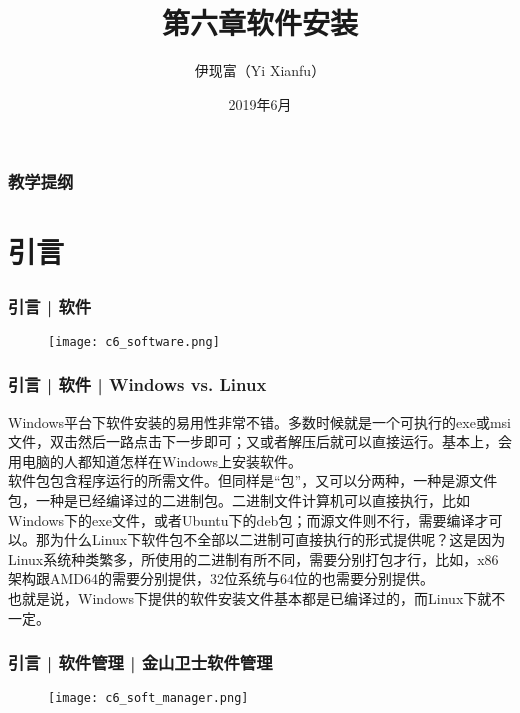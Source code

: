 



\title[软件安装]{第六章\quad 软件安装}
\author[Yixf]{伊现富（Yi Xianfu）}
\date{2019年6月}


\begin{frame}
  \titlepage
\end{frame}

\begin{frame}[plain,label=current]
  \frametitle{教学提纲}
  \setcounter{tocdepth}{3}
  \begin{multicols}{2}
    \tableofcontents
  \end{multicols}
\end{frame}


\section{引言}
\begin{frame}
  \frametitle{引言 | 软件}
  \begin{figure}
    \centering
    \texttt{[image: c6\_software.png]}
  \end{figure}
\end{frame}

\begin{frame}
  \frametitle{引言 | 软件 | Windows vs. Linux}
  Windows平台下软件安装的易用性非常不错。多数时候就是一个可执行的exe或msi文件，双击然后一路点击下一步即可；又或者解压后就可以直接运行。基本上，会用电脑的人都知道怎样在Windows上安装软件。\\
  \vspace{5pt}
  软件包包含程序运行的所需文件。但同样是“包”，又可以分两种，一种是源文件包，一种是已经编译过的二进制包。二进制文件计算机可以直接执行，比如Windows下的exe文件，或者Ubuntu下的deb包；而源文件则不行，需要编译才可以。那为什么Linux下软件包不全部以二进制可直接执行的形式提供呢？这是因为Linux系统种类繁多，所使用的二进制有所不同，需要分别打包才行，比如，x86架构跟AMD64的需要分别提供，32位系统与64位的也需要分别提供。\\
  \vspace{5pt}
  也就是说，Windows下提供的软件安装文件基本都是已编译过的，而Linux下就不一定。
\end{frame}

\begin{frame}
  \frametitle{引言 | 软件管理 | 金山卫士软件管理}
  \begin{figure}
    \centering
    \texttt{[image: c6\_soft\_manager.png]}
  \end{figure}
\end{frame}

